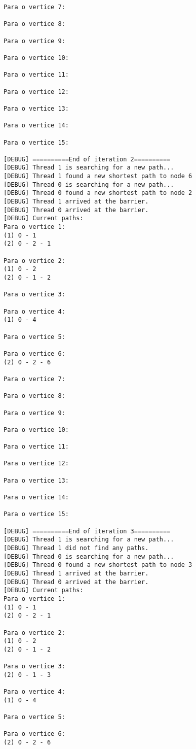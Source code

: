 \documentclass[a4paper,11pt]{article}
\begin{document}
\begin{verbatim}
Para o vertice 7:

Para o vertice 8:

Para o vertice 9:

Para o vertice 10:

Para o vertice 11:

Para o vertice 12:

Para o vertice 13:

Para o vertice 14:

Para o vertice 15:

[DEBUG] ==========End of iteration 2==========
[DEBUG] Thread 1 is searching for a new path...
[DEBUG] Thread 1 found a new shortest path to node 6
[DEBUG] Thread 0 is searching for a new path...
[DEBUG] Thread 0 found a new shortest path to node 2
[DEBUG] Thread 1 arrived at the barrier.
[DEBUG] Thread 0 arrived at the barrier.
[DEBUG] Current paths:
Para o vertice 1:
(1) 0 - 1
(2) 0 - 2 - 1

Para o vertice 2:
(1) 0 - 2
(2) 0 - 1 - 2

Para o vertice 3:

Para o vertice 4:
(1) 0 - 4

Para o vertice 5:

Para o vertice 6:
(2) 0 - 2 - 6

Para o vertice 7:

Para o vertice 8:

Para o vertice 9:

Para o vertice 10:

Para o vertice 11:

Para o vertice 12:

Para o vertice 13:

Para o vertice 14:

Para o vertice 15:

[DEBUG] ==========End of iteration 3==========
[DEBUG] Thread 1 is searching for a new path...
[DEBUG] Thread 1 did not find any paths.
[DEBUG] Thread 0 is searching for a new path...
[DEBUG] Thread 0 found a new shortest path to node 3
[DEBUG] Thread 1 arrived at the barrier.
[DEBUG] Thread 0 arrived at the barrier.
[DEBUG] Current paths:
Para o vertice 1:
(1) 0 - 1
(2) 0 - 2 - 1

Para o vertice 2:
(1) 0 - 2
(2) 0 - 1 - 2

Para o vertice 3:
(2) 0 - 1 - 3

Para o vertice 4:
(1) 0 - 4

Para o vertice 5:

Para o vertice 6:
(2) 0 - 2 - 6


\end{verbatim}
\end{document}
